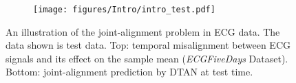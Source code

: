\begin{figure}[t]
\centering
\def\figwidth{0.98\linewidth } %


\begin{subfigure}{\figwidth}
 \centering
{\texttt{[image: figures/Intro/intro\_test.pdf]}}%
\end{subfigure}

\caption{An illustration of the joint-alignment problem in ECG data. 
The data shown is test data. 
    Top: temporal misalignment between ECG signals and its effect on the sample mean (\textit{ECGFiveDays} Dataset).
    Bottom: joint-alignment prediction by DTAN at test time.}
\label{fig:intro}
\end{figure}
